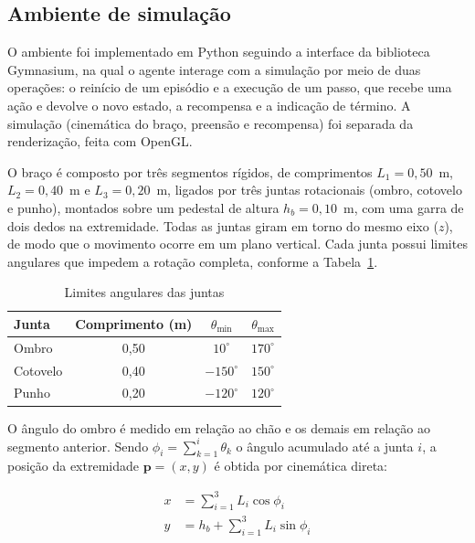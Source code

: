 \documentclass[conference]{IEEEtran}
\begin{document}
\subsection{Ambiente de simulação}

O ambiente foi implementado em Python seguindo a interface da biblioteca Gymnasium, na qual o agente interage com a simulação por meio de duas operações: o reinício de um episódio e a execução de um passo, que recebe uma ação e devolve o novo estado, a recompensa e a indicação de término. A simulação (cinemática do braço, preensão e recompensa) foi separada da renderização, feita com OpenGL.

O braço é composto por três segmentos rígidos, de comprimentos $L_1 = 0{,}50$~m, $L_2 = 0{,}40$~m e $L_3 = 0{,}20$~m, ligados por três juntas rotacionais (ombro, cotovelo e punho), montados sobre um pedestal de altura $h_b = 0{,}10$~m, com uma garra de dois dedos na extremidade. Todas as juntas giram em torno do mesmo eixo ($z$), de modo que o movimento ocorre em um plano vertical. Cada junta possui limites angulares que impedem a rotação completa, conforme a Tabela~\ref{tab:juntas}.

\begin{table}[htb]
    \centering
    \caption{Limites angulares das juntas}
    \label{tab:juntas}
    \begin{tabular}{lccc}
        \hline
        Junta & Comprimento (m) & $\theta_{\min}$ & $\theta_{\max}$ \\
        \hline
        Ombro    & 0,50 & $10^\circ$   & $170^\circ$ \\
        Cotovelo & 0,40 & $-150^\circ$ & $150^\circ$ \\
        Punho    & 0,20 & $-120^\circ$ & $120^\circ$ \\
        \hline
    \end{tabular}
\end{table}

O ângulo do ombro é medido em relação ao chão e os demais em relação ao segmento anterior. Sendo $\phi_i = \sum_{k=1}^{i} \theta_k$ o ângulo acumulado até a junta $i$, a posição da extremidade $\mathbf{p} = (x, y)$ é obtida por cinemática direta:

\begin{equation}
    \begin{aligned}
        x &= \sum_{i=1}^{3} L_i \cos \phi_i \\
        y &= h_b + \sum_{i=1}^{3} L_i \sin \phi_i
    \end{aligned}
    \label{eq:cinematica}
\end{equation}
\end{document}
